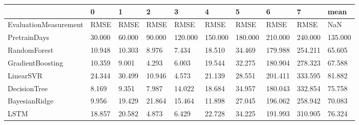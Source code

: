 \begin{tabular}{llllllllll}
\toprule
{} &      0 &      1 &      2 &       3 &       4 &       5 &       6 &       7 &    mean \\
\midrule
EvaluationMeasurement &   RMSE &   RMSE &   RMSE &    RMSE &    RMSE &    RMSE &    RMSE &    RMSE &     NaN \\
PretrainDays          & 30.000 & 60.000 & 90.000 & 120.000 & 150.000 & 180.000 & 210.000 & 240.000 & 135.000 \\
RandomForest          & 10.948 & 10.303 &  8.976 &   7.434 &  18.510 &  34.469 & 179.988 & 254.211 &  65.605 \\
GradientBoosting      & 10.359 &  9.001 &  4.293 &   6.003 &  19.544 &  32.275 & 180.904 & 278.323 &  67.588 \\
LinearSVR             & 24.344 & 30.499 & 10.946 &   4.573 &  21.139 &  28.551 & 201.411 & 333.595 &  81.882 \\
DecisionTree          &  8.169 &  9.351 &  7.987 &  14.022 &  18.684 &  34.957 & 180.043 & 332.854 &  75.758 \\
BayesianRidge         &  9.956 & 19.429 & 21.864 &  15.464 &  11.898 &  27.045 & 196.062 & 258.942 &  70.083 \\
LSTM                  & 18.857 & 20.582 &  4.873 &   6.429 &  22.728 &  34.225 & 191.993 & 310.905 &  76.324 \\
\bottomrule
\end{tabular}
